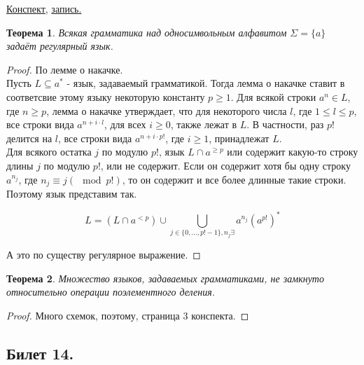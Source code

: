 \documentclass[a4paper]{article}
\newcommand{\mybox}{%
    \collectbox{%
        \setlength{\fboxsep}{1pt}%
        \fbox{\BOXCONTENT}%
    }%
}
\theoremstyle{indented}
\newtheorem{theorem}{Теорема}
\theoremstyle{definition}
\theoremstyle{remark}
\begin{document}
\begin{flushright}
    \mybox{
        \href{https://users.math-cs.spbu.ru/~okhotin/teaching/tcs_fl_2021/okhotin_tcs_fl_2021_l7.pdf}{Конспект,}
        \href{https://disk.yandex.ru/d/knoQ44wLmGDwwQ/2021-2022%20учебный%20год%20(осенний%20семестр)/2%20курс/Теоретическая%20информатика/M2021-10-13_111709_1h40m_102.mp4}{запись.}
    }
\end{flushright}

\begin{theorem}
    Всякая грамматика над односимвольным алфавитом $\Sigma = \{a\}$ задаёт регулярный язык.
\end{theorem}

\begin{proof}
    По лемме о накачке. \\ 

    Пусть $L \subseteq a^*$ - язык, задаваемый грамматикой. Тогда лемма о накачке ставит в соответсвие этому языку некоторую константу $p \geq 1$. Для всякой строки $a^n \in L$, где $n \geq p$, лемма о накачке утверждает, что для некоторого числа $l$, где $1 \leq l \leq p$, все строки вида $a^{n+i\cdot l}$, для всех $i \geq 0$, также лежат в $L$. В частности, раз $p!$ делится на $l$, все строки вида $a^{n+i\cdot p!}$, где $i \geq 1$, принадлежат $L$. \\ 
    
    Для всякого остатка $j$ по модулю $p!$, язык $L \cap a^{\geq p}$ или содержит какую-то строку длины $j$ по модулю $p!$, или не содержит. Если он содержит хотя бы одну строку $a^{n_j}$, где $n_j \equiv j (\mod p!)$, то он содержит и все более длинные такие строки. Поэтому язык представим так.

    \[
        L = (L \cap a^{<p}) \cup \bigcup_{j \in \{0, \ldots, p! - 1\}, n_j \exists} a^{n_j} (a^{p!})^* 
    \] 

    А это по существу регулярное выражение.
\end{proof}

\begin{theorem}
    Множество языков, задаваемых грамматиками, не замкнуто относительно операции поэлементного деления.
\end{theorem}

\begin{proof}
    Много схемок, поэтому, страница 3 конспекта.
\end{proof}



\newpage 

\subsection{Билет 14.}
\end{document}
